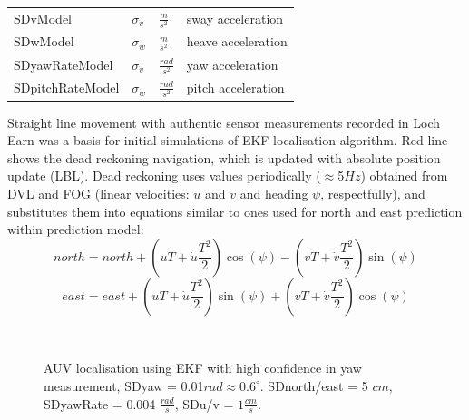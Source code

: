 \begin{table}
\begin{tabular}{llll}
\multirow{1}{*}{SDvModel} & \multirow{1}{*}{$\sigma_{\dot{v}}$}  & \multirow{1}{*}{$\frac{m}{s^{2}}$} & \multirow{1}{*}{sway acceleration} \\
\multirow{1}{*}{SDwModel} & \multirow{1}{*}{$\sigma_{\dot{w}}$}  & \multirow{1}{*}{$\frac{m}{s^{2}}$} & \multirow{1}{*}{heave acceleration} \\
\multirow{1}{*}{SDyawRateModel} & \multirow{1}{*}{$\sigma_{\dot{v}}$}  & \multirow{1}{*}{$\frac{rad}{s^{2}}$} & \multirow{1}{*}{yaw acceleration} \\
\multirow{1}{*}{SDpitchRateModel} & \multirow{1}{*}{$\sigma_{\dot{w}}$}  & \multirow{1}{*}{$\frac{rad}{s^{2}}$} & \multirow{1}{*}{pitch acceleration} \\
\bottomrule
\end{tabular} 
\end{table}
Straight line movement with authentic sensor measurements recorded in Loch Earn was a basis for initial simulations of EKF localisation algorithm. Red line shows the dead reckoning navigation, which is updated with absolute position update (LBL). Dead reckoning uses values periodically ($\approx$5$Hz$) obtained from DVL and FOG (linear velocities: $u$ and $v$ and heading $\psi$, respectfully), and substitutes them into equations similar to ones used for north and east prediction within prediction model: 
$$ north = north + (uT+\dot{u}\frac{T^{2}}{2})\cos(\psi) - (vT+\dot{v}\frac{T^{2}}{2})\sin(\psi) $$
$$ east  = east  + (uT+\dot{u}\frac{T^{2}}{2})\sin(\psi) + (vT+\dot{v}\frac{T^{2}}{2})\cos(\psi) $$
\begin{figure}%
  \centering
     \\   
\caption{AUV localisation using EKF with high confidence in yaw measurement, SDyaw = 0.01$rad \approx 0.6 ^{\circ}$. SDnorth/east = 5 $cm$, SDyawRate = 0.004 $\frac{rad}{s}$, SDu/v = $1\frac{cm}{s}$.}
\label{fig:auv-sim-straight2}
\end{figure}
